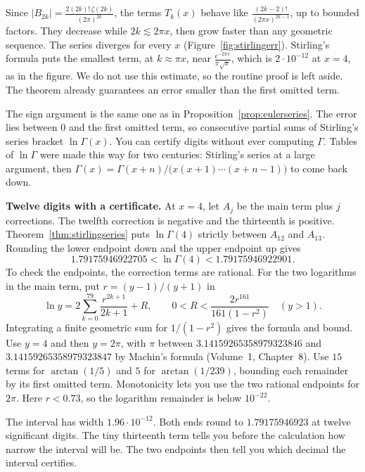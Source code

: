 Since $|B_{2k}|=\frac{2(2k)!\,\zeta(2k)}{(2\pi)^{2k}}$, the terms $T_k(x)$ behave like $\frac{(2k-2)!}{(2\pi x)^{2k-1}}$, up to bounded factors. They decrease while $2k\lesssim2\pi x$, then grow faster than any geometric sequence. The series diverges for every $x$ (Figure~\ref{fig:stirlingerr}). Stirling's formula puts the smallest term, at $k\approx\pi x$, near $\frac{e^{-2\pi x}}{\pi\sqrt x}$, which is $2\cdot10^{-12}$ at $x=4$, as in the figure. We do not use this estimate, so the routine proof is left aside. The theorem already guarantees an error smaller than the first omitted term.

\begin{beauty}
The sign argument is the same one as in Proposition~\ref{prop:eulerseries}. The error lies between $0$ and the first omitted term, so consecutive partial sums of Stirling's series bracket $\ln\Gamma(x)$. You can certify digits without ever computing $\Gamma$. Tables of $\ln\Gamma$ were made this way for two centuries: Stirling's series at a large argument, then $\Gamma(x)=\Gamma(x+n)/\bigl(x(x+1)\cdots(x+n-1)\bigr)$ to come back down.
\end{beauty}

\textbf{Twelve digits with a certificate.} At $x=4$, let $A_j$ be the main term plus $j$ corrections. The twelfth correction is negative and the thirteenth is positive. Theorem~\ref{thm:stirlingseries} puts $\ln\Gamma(4)$ strictly between $A_{12}$ and $A_{13}$. Rounding the lower endpoint down and the upper endpoint up gives
\[
1.79175946922705<\ln\Gamma(4)<1.79175946922901.
\]
To check the endpoints, the correction terms are rational. For the two logarithms in the main term, put $r=(y-1)/(y+1)$ in
\[
\ln y=2\sum_{k=0}^{79}\frac{r^{2k+1}}{2k+1}+R,
\qquad
0<R<\frac{2r^{161}}{161(1-r^2)}\quad(y>1).
\]
Integrating a finite geometric sum for $1/(1-r^2)$ gives the formula and bound. Use $y=4$ and then $y=2\pi$, with $\pi$ between $3.14159265358979323846$ and $3.14159265358979323847$ by Machin's formula (Volume~1, Chapter~8). Use $15$ terms for $\arctan(1/5)$ and $5$ for $\arctan(1/239)$, bounding each remainder by its first omitted term. Monotonicity lets you use the two rational endpoints for $2\pi$. Here $r<0.73$, so the logarithm remainder is below $10^{-22}$.

The interval has width $1.96\cdot10^{-12}$. Both ends round to $1.79175946923$ at twelve significant digits. The tiny thirteenth term tells you before the calculation how narrow the interval will be. The two endpoints then tell you which decimal the interval certifies.

